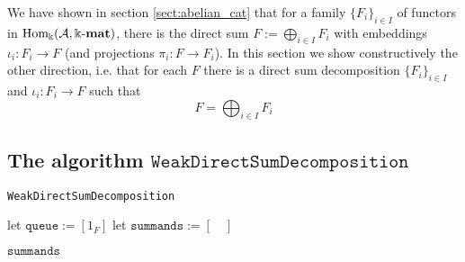 
We have shown in section \ref{sect:abelian_cat} that for a family $\{F_{i}\}_{i\in I}$ of functors in $\mathrm{Hom_{\Bbbk}}(\mathcal{A},\Bbbk\textnormal{-}\mathbf{mat})$, there is the
direct sum $F := \bigoplus_{i\in I} F_{i}$ with embeddings $\iota_{i} : F_{i} \rightarrow F$ (and projections $\pi_{i} : F \rightarrow F_{i}$).
In this section we show constructively the other direction, i.e. that for each $F$ there is a direct sum decomposition
$\{F_{i}\}_{i\in I}$ and $\iota_{i} : F_{i} \rightarrow F$ such that
\[
F = \bigoplus_{i\in I} F_{i}
\]

\subsection{The algorithm $\mathtt{WeakDirectSumDecomposition}$}

\begin{algorithm}[H]\capstart
    \caption{\texttt{WeakDirectSumDecomposition}}\label{algo:WeakDirectSumDecomposition}
	\BlankLine
	let $\mathtt{queue} := [ 1_{F} ]$\;
	let $\mathtt{summands} := [ \quad ]$\;
	
	\BlankLine
	\Return $\mathtt{summands}$\;
\end{algorithm}

